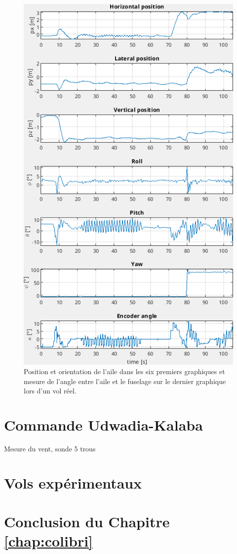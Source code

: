 \begin{figure}[ht!]
\centering
    \includegraphics[width=0.6\columnwidth,angle=0]{figures/colibri_flight.png}
    \caption{Position et orientation de l'aile dans les six premiers graphiques et mesure de l'angle entre l'aile et le fuselage sur le dernier graphique lors d'un vol réel. }
    \label{fig:colibri_flight}
\end{figure}

\section{Commande Udwadia-Kalaba}

Mesure du vent, sonde 5 trous

\section{Vols expérimentaux}

\section{Conclusion du Chapitre \ref{chap:colibri}}







